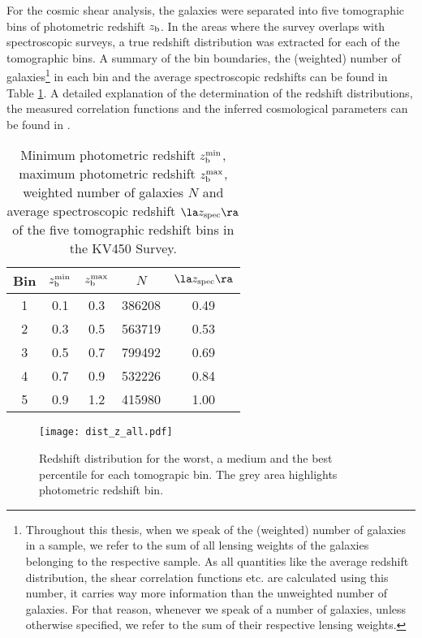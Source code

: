 For the cosmic shear analysis, the galaxies were separated into five tomographic bins of photometric redshift $z_{\rm b}$. In the areas where the survey overlaps with spectroscopic surveys, a true redshift distribution was extracted for each of the tomographic bins. A summary of the bin boundaries, the (weighted) number of galaxies\footnote{Throughout this thesis, when we speak of the (weighted) number of galaxies in a sample, we refer to the sum of all lensing weights of the galaxies belonging to the respective sample. As all quantities like the average redshift distribution, the shear correlation functions etc.\! are calculated using this number, it carries way more information than the unweighted number of galaxies. For that reason, whenever we speak of a number of galaxies, unless otherwise specified, we refer to the sum of their respective lensing weights.} in each bin and the average spectroscopic redshifts can be found in Table \ref{tab:tomograpic_bins}. A detailed explanation of the determination of the redshift distributions, the measured correlation functions and the inferred cosmological parameters can be found in \citet{2017MNRAS.465.1454H,2018arXiv181206076H}.
\begin{SCtable}
\centering
\begin{tabular}{ccccc}
\toprule
Bin & $z_{\rm b}^{\rm{min}}$ & $z_{\rm b}^{\rm{max}}$ & $N$ & $\la z_{\rm{spec}} \ra$ \\
\midrule
1 & 0.1 & 0.3 &   386208 & 0.49 \\
2 & 0.3 & 0.5 &   563719 & 0.53 \\
3 & 0.5 & 0.7 &   799492 & 0.69 \\
4 & 0.7 & 0.9 &   532226 & 0.84 \\
5 & 0.9 & 1.2 &   415980 & 1.00 \\
\bottomrule
\end{tabular}
\caption[Properties of the tomographic redshift bins in the KV450 Survey.]{Minimum photometric redshift $z_{\rm b}^{\rm{min}}$, maximum photometric redshift $z_{\rm b}^{\rm{max}}$, weighted number of galaxies $N$ and average spectroscopic redshift  $\la z_{\rm{spec}} \ra$ of the five tomographic redshift bins in the KV450 Survey.}
\label{tab:tomograpic_bins}
\end{SCtable}
\begin{figure}
\centering
\texttt{[image: dist\_z\_all.pdf]}
\caption[Redshift distribution for the worst, a medium and the best percentile]{Redshift distribution for the worst, a medium and the best percentile for each tomograpic bin. The grey area highlights photometric redshift bin.}
\label{fig:redshifts_per_percentile}
\end{figure}

